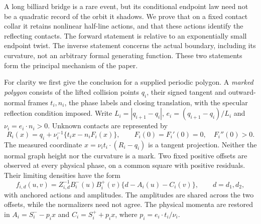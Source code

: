 A long billiard bridge is a rare event, but its conditional endpoint law
need not be a quadratic record of the orbit it shadows.  We prove that
on a fixed contact collar it retains nonlinear half-line actions, and
that these actions identify the reflecting contacts.  The forward
statement is relative to an exponentially small endpoint twist.  The
inverse statement concerns the actual boundary, including its curvature,
not an arbitrary formal generating function.  These two statements form
the principal mechanism of the paper.

For clarity we first give the conclusion for a supplied periodic polygon.
A \emph{marked polygon} consists of the lifted collision points $q_i$,
their signed tangent and outward-normal frames $t_i,n_i$, the phase labels
and closing translation, with the specular reflection condition imposed.
Write $L_i=|q_{i+1}-q_i|$, $e_i=(q_{i+1}-q_i)/L_i$ and
$\nu_i=e_i\cdot n_i>0$.  Unknown contacts are represented by
\[
 R_i(x)=q_i+\nu_i^{-1}\{t_i x-n_iF_i(x)\},\qquad
 F_i(0)=F_i'(0)=0,\quad F_i''(0)>0.
\]
The measured coordinate $x=\nu_i t_i\cdot(R_i-q_i)$ is a tangent
projection.  Neither the normal graph height nor the curvature is a mark.
Two fixed positive offsets are observed at every physical phase, on a
common square with positive residuals.  Their limiting densities have
the form
\[
 f_{i,d}(u,v)=Z_{i,d}^{-1}B_i^-(u)B_i^+(v)
              \{d-A_i(u)-C_i(v)\},\qquad d=d_1,d_2,
\]
with anchored actions and amplitudes.  The amplitudes are shared across
the two offsets, while the normalizers need not agree.  The physical
momenta are restored in $A_i=S_i^- -p_i x$ and
$C_i=S_i^+ +p_i x$, where $p_i=e_i\cdot t_i/\nu_i$.

